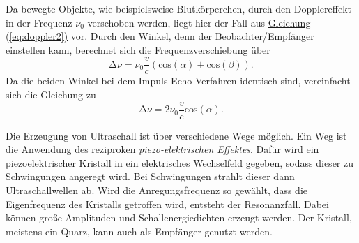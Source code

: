 Da bewegte Objekte, wie beispielsweise Blutkörperchen, durch den Dopplereffekt in der Frequenz $\nu_0$ verschoben werden, liegt hier der Fall aus \hyperref[eq:doppler2]{Gleichung (\ref{eq:doppler2})} vor.
Durch den Winkel, denn der Beobachter/Empfänger einstellen kann, berechnet sich die Frequenzverschiebung über
\begin{equation}
    \increment \nu = \nu_0 \frac{v}{c}\left(\text{cos}(\alpha) + \text{cos}(\beta)\right).
\end{equation}
Da die beiden Winkel bei dem Impuls-Echo-Verfahren identisch sind, vereinfacht sich die Gleichung zu
\begin{equation} \label{eq:freqvers}
    \increment \nu = 2 \nu_0 \frac{v}{c} \text{cos}(\alpha).
\end{equation}

Die Erzeugung von Ultraschall ist über verschiedene Wege möglich.
Ein Weg ist die Anwendung des reziproken \textit{piezo-elektrischen Effektes}.
Dafür wird ein piezoelektrischer Kristall in ein elektrisches Wechselfeld gegeben, sodass dieser zu Schwingungen angeregt wird.
Bei Schwingungen strahlt dieser dann Ultraschallwellen ab.
Wird die Anregungsfrequenz so gewählt, dass die Eigenfrequenz des Kristalls getroffen wird, entsteht der Resonanzfall.
Dabei können große Amplituden und Schallenergiedichten erzeugt werden.
Der Kristall, meistens ein Quarz, kann auch als Empfänger genutzt werden.